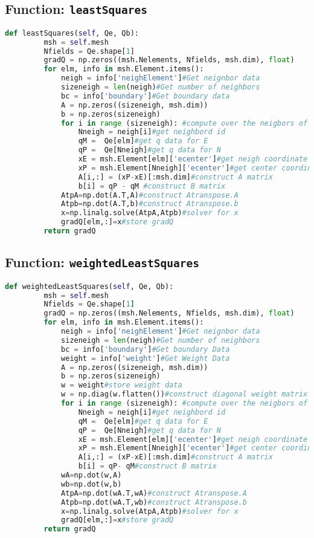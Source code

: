 \documentclass{article}
\begin{document}
\subsection*{Function: \texttt{leastSquares}}
\begin{lstlisting}[language=Python]
    def leastSquares(self, Qe, Qb):
         msh = self.mesh
         Nfields = Qe.shape[1]
         gradQ = np.zeros((msh.Nelements, Nfields, msh.dim), float)
         for elm, info in msh.Element.items():
             neigh = info['neighElement']#Get neignbor data
             sizeneigh = len(neigh)#Get number of neighbors
             bc = info['boundary']#Get boundary data
             A = np.zeros((sizeneigh, msh.dim))
             b = np.zeros(sizeneigh)
             for i in range (sizeneigh): #compute over the neigbors of the element
                 Nneigh = neigh[i]#get neighbord id
                 qM =  Qe[elm]#get q data for E
                 qP =  Qe[Nneigh]#get q data for N
                 xE = msh.Element[elm]['ecenter']#get neigh coordinate
                 xP = msh.Element[Nneigh]['ecenter']#get center coordinate
                 A[i,:] = (xP-xE)[:msh.dim]#construct A matrix
                 b[i] = qP - qM #construct B matrix
             AtpA=np.dot(A.T,A)#construct Atranspose.A
             Atpb=np.dot(A.T,b)#construct Atranspose.b
             x=np.linalg.solve(AtpA,Atpb)#solver for x
             gradQ[elm,:]=x#store gradQ
         return gradQ
\end{lstlisting}

\subsection*{Function: \texttt{weightedLeastSquares}}
\begin{lstlisting}[language=Python]
    def weightedLeastSquares(self, Qe, Qb):
         msh = self.mesh
         Nfields = Qe.shape[1]
         gradQ = np.zeros((msh.Nelements, Nfields, msh.dim), float)
         for elm, info in msh.Element.items():
             neigh = info['neighElement']#Get neignbor data
             sizeneigh = len(neigh)#Get number of neighbors
             bc = info['boundary']#Get boundary Data
             weight = info['weight']#Get Weight Data
             A = np.zeros((sizeneigh, msh.dim))
             b = np.zeros(sizeneigh)
             w = weight#store weight data
             w = np.diag(w.flatten())#construct diagonal weight matrix
             for i in range (sizeneigh): #compute over the neigbors of the element
                 Nneigh = neigh[i]#get neighbord id
                 qM =  Qe[elm]#get q data for E
                 qP =  Qe[Nneigh]#get q data for N
                 xE = msh.Element[elm]['ecenter']#get neigh coordinate
                 xP = msh.Element[Nneigh]['ecenter']#get center coordinate
                 A[i,:] = (xP-xE)[:msh.dim]#construct A matrix
                 b[i] = qP- qM#construct B matrix
             wA=np.dot(w,A)
             wb=np.dot(w,b)
             AtpA=np.dot(wA.T,wA)#construct Atranspose.A
             Atpb=np.dot(wA.T,wb)#construct Atranspose.b
             x=np.linalg.solve(AtpA,Atpb)#solver for x
             gradQ[elm,:]=x#store gradQ
         return gradQ

\end{lstlisting}
\end{document}

